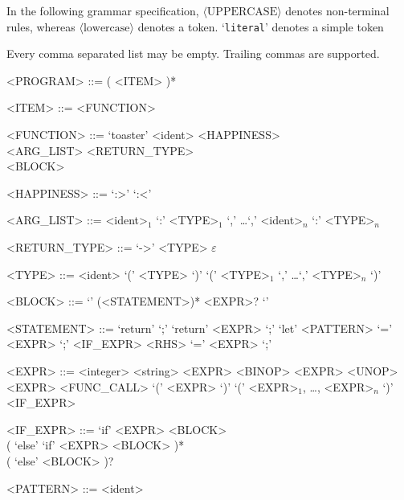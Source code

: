 \documentclass[10pt]{artikel1}
\newcommand{\eempty}{$\varepsilon$}
\begin{document}
In the following grammar specification, $\langle \text{UPPERCASE} \rangle$
denotes non-terminal rules, whereas $\langle \text{lowercase} \rangle$ denotes a token. `\verb|literal|' denotes a simple token

Every comma separated list may be empty. Trailing commas are supported.

\begin{grammar}


    <PROGRAM> ::= ( <ITEM> )*

    <ITEM> ::= <FUNCTION>

    <FUNCTION> ::= `toaster' <ident> <HAPPINESS> \\
    <ARG_LIST> <RETURN_TYPE> \\
    <BLOCK>

    <HAPPINESS> ::= `:>' \alt `:<'


    <ARG_LIST> ::= <ident>$_1$ `:' <TYPE>$_1$ `,' \dots `,' <ident>$_n$ `:' <TYPE>$_n$

    <RETURN_TYPE> ::= `->' <TYPE>
    \alt \eempty

    <TYPE> ::= <ident>
    \alt `(' <TYPE> `)'
    \alt `(' <TYPE>$_1$ `,' \dots `,' <TYPE>$_n$ `)'


    <BLOCK> ::= `{' (<STATEMENT>)* <EXPR>? `}'

    <STATEMENT> ::= `return' `;'
    \alt `return' <EXPR> `;'
    \alt `let' <PATTERN> `=' <EXPR> `;'
    \alt <IF_EXPR>
    \alt <RHS> `=' <EXPR> `;'

    <EXPR> ::= <integer>
    \alt <string>
    \alt <EXPR> <BINOP> <EXPR>
    \alt <UNOP> <EXPR>
    \alt <FUNC_CALL>
    \alt `(' <EXPR> `)'
    \alt `(' <EXPR>$_1$, \dots, <EXPR>$_n$ `)'
    \alt <IF_EXPR>

    <IF_EXPR> ::= `if' <EXPR> <BLOCK> \\ ( `else' `if' <EXPR> <BLOCK> )* \\( `else' <BLOCK> )?

    <PATTERN> ::= <ident>

\end{grammar}
\end{document}
